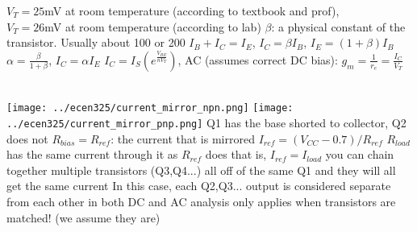 \documentclass[12pt]{article}
\begin{document}
\begin{spacing}{0.8}
\begin{multicols*}{2}
\begin{flushleft}
\begin{outline}[longenum]
  \1 $V_T = 25$mV at room temperature (according to textbook and prof),
  \\ $V_T = 26$mV at room temperature (according to lab)
  \1 $\beta$: a physical constant of the transistor. Usually about 100 or 200
  \1
    $I_B + I_C = I_E$,
    $I_C = \beta I_B$,
    $I_E = (1+\beta) I_B$
  \1
    $\alpha = \frac{\beta}{1+\beta}$,
    $I_C = \alpha I_E$
  \1
    $I_C = I_S ( e^{\frac{V_{BE}}{n V_T}} )$,
  \1 AC (assumes correct DC bias):
    $g_m = \frac{1}{r_e} = \frac{I_C}{V_T}$

\\
\texttt{[image: ../ecen325/current\_mirror\_npn.png]}
\texttt{[image: ../ecen325/current\_mirror\_pnp.png]}
  \1 Q1 has the base shorted to collector, Q2 does not
  \1 $R_{bias}=R_{ref}$: the current that is mirrored
  \1 $I_{ref}=(V_{CC}-0.7)/R_{ref}$
  \1 $R_{load}$ has the same current through it as $R_{ref}$ does
    \2 that is, $I_{ref} = I_{load}$
  \1 you can chain together multiple transistors (Q3,Q4...) all off of
    the same Q1 and they will all get the same current
    \2 In this case, each Q2,Q3... output is considered separate from each other
      in both DC and AC analysis
  \1 only applies when transistors are matched! (we assume they are)


\end{outline}
\end{flushleft}
\end{multicols*}
\end{spacing}
\end{document}
